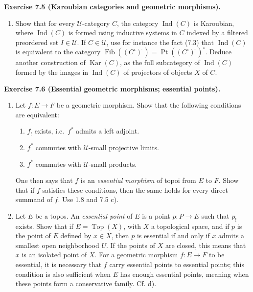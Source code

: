 \documentclass[11pt]{article}
\newcommand{\U}{\mathcal{U}}
\newcommand{\Top}{\operatorname{Top}}
\newcommand{\Ppoint}{\operatorname{Pt}}
\newcommand{\Ffib}{\operatorname{Fib}}
\newcommand{\ie}{i.e.}
\newenvironment{remarktext}[1]{\par\medskip\noindent\textbf{#1.}\ }{\par\medskip}
\providecommand{\Ind}{\operatorname{Ind}}
\providecommand{\kar}{\operatorname{Kar}}
\begin{document}
\begin{remarktext}{Exercise 7.5 (Karoubian categories and geometric morphisms)}
\begin{enumerate}[label=\alph*)]
\item Show that for every \(\U\)-category \(C\), the category \(\Ind(C)\) is Karoubian, where \(\Ind(C)\) is formed using inductive systems in \(C\) indexed by a filtered preordered set \(I\in\U\). If \(C\in\U\), use for instance the fact (7.3) that \(\Ind(C)\) is equivalent to the category \(\Ffib((C^\circ)^{\widehat{\phantom{,}}})=\Ppoint((C^\circ)^{\widehat{\phantom{,}}})^\circ\). Deduce another construction of \(\kar(C)\), as the full subcategory of \(\Ind(C)\) formed by the images in \(\Ind(C)\) of projectors of objects \(X\) of \(C\).
\end{enumerate}
\end{remarktext}

\begin{remarktext}{Exercise 7.6 (Essential geometric morphisms; essential points)}
\begin{enumerate}[label=\alph*)]
\item Let \(f:E\to F\) be a geometric morphism. Show that the following conditions are equivalent:
\begin{enumerate}[label=(\roman*)]
\item \(f_!\) exists, \ie\ \(f^*\) admits a left adjoint.
\item \(f^*\) commutes with \(\U\)-small projective limits.
\item \(f^*\) commutes with \(\U\)-small products.
\end{enumerate}
One then says that \(f\) is an \emph{essential morphism} of topoi from \(E\) to \(F\). Show that if \(f\) satisfies these conditions, then the same holds for every direct summand of \(f\). Use 1.8 and 7.5 c).

\item Let \(E\) be a topos. An \emph{essential point} of \(E\) is a point \(p:P\to E\) such that \(p_!\) exists. Show that if \(E=\Top(X)\), with \(X\) a topological space, and if \(p\) is the point of \(E\) defined by \(x\in X\), then \(p\) is essential if and only if \(x\) admits a smallest open neighborhood \(U\). If the points of \(X\) are closed, this means that \(x\) is an isolated point of \(X\). For a geometric morphism \(f:E\to F\) to be essential, it is necessary that \(f\) carry essential points to essential points; this condition is also sufficient when \(E\) has enough essential points, meaning when these points form a conservative family. Cf. d).


\end{enumerate}
\end{remarktext}
\end{document}
